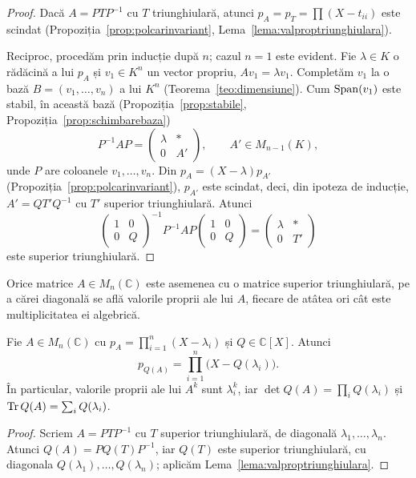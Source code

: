 \begin{proof}
Dacă $A=PTP^{-1}$ cu $T$ triunghiulară, atunci $p_A=p_T=\prod(X-t_{ii})$ este scindat (Propoziția~\ref{prop:polcarinvariant}, Lema~\ref{lema:valproptriunghiulara}).

Reciproc, procedăm prin inducție după $n$; cazul $n=1$ este evident. Fie $\lambda\in K$ o rădăcină a lui $p_A$ și $v_1\in K^n$ un vector propriu, $Av_1=\lambda v_1$. Completăm $v_1$ la o bază $B=(v_1,\dots,v_n)$ a lui $K^n$ (Teorema~\ref{teo:dimensiune}). Cum $\operatorname{Span}(v_1)$ este stabil, în această bază (Propoziția~\ref{prop:stabile}, Propoziția~\ref{prop:schimbarebaza})
\[
P^{-1}AP=\begin{pmatrix}\lambda&*\\0&A'\end{pmatrix},\qquad A'\in M_{n-1}(K),
\]
unde $P$ are coloanele $v_1,\dots,v_n$. Din $p_A=(X-\lambda)p_{A'}$ (Propoziția~\ref{prop:polcarinvariant}), $p_{A'}$ este scindat, deci, din ipoteza de inducție, $A'=QT'Q^{-1}$ cu $T'$ superior triunghiulară. Atunci
\[
\begin{pmatrix}1&0\\0&Q\end{pmatrix}^{-1}P^{-1}AP\begin{pmatrix}1&0\\0&Q\end{pmatrix}=\begin{pmatrix}\lambda&*\\0&T'\end{pmatrix}
\]
este superior triunghiulară.
\end{proof}

\begin{corolar}\label{cor:triangC}
Orice matrice $A\in M_n(\mathbb{C})$ este asemenea cu o matrice superior triunghiulară, pe a cărei diagonală se află valorile proprii ale lui $A$, fiecare de atâtea ori cât este multiplicitatea ei algebrică.
\end{corolar}

\begin{teorema}\label{teo:valpropQ}
Fie $A\in M_n(\mathbb{C})$ cu $p_A=\prod_{i=1}^n(X-\lambda_i)$ și $Q\in\mathbb{C}[X]$. Atunci
\[
p_{Q(A)}=\prod_{i=1}^n\bigl(X-Q(\lambda_i)\bigr).
\]
În particular, valorile proprii ale lui $A^k$ sunt $\lambda_i^k$, iar $\det Q(A)=\prod_iQ(\lambda_i)$ și $\operatorname{Tr} Q(A)=\sum_iQ(\lambda_i)$.
\end{teorema}

\begin{proof}
Scriem $A=PTP^{-1}$ cu $T$ superior triunghiulară, de diagonală $\lambda_1,\dots,\lambda_n$. Atunci $Q(A)=PQ(T)P^{-1}$, iar $Q(T)$ este superior triunghiulară, cu diagonala $Q(\lambda_1),\dots,Q(\lambda_n)$; aplicăm Lema~\ref{lema:valproptriunghiulara}.
\end{proof}

